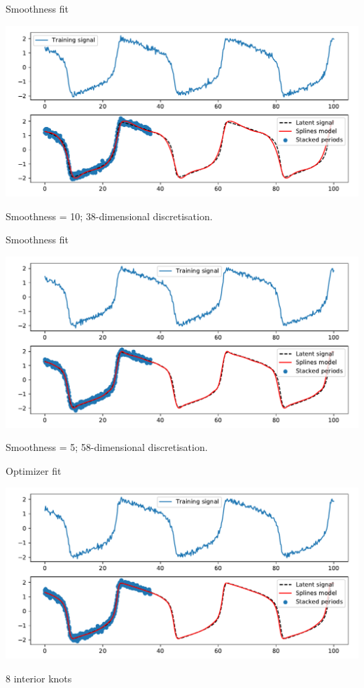 \documentclass[presentation]{beamer}
\begin{document}
\begin{frame}[label={sec:orgdc37deb}]{Smoothness fit}
   \begin{center}
\includegraphics[width=.9\linewidth]{./fit1.pdf}
\end{center}
Smoothness = 10; 38-dimensional discretisation.
\end{frame}

\begin{frame}[label={sec:org53ba107}]{Smoothness fit}
   \begin{center}
\includegraphics[width=.9\linewidth]{./fit2.pdf}
\end{center}
Smoothness = 5; 58-dimensional discretisation.
\end{frame}

\begin{frame}[label={sec:org22748d4}]{Optimizer fit}
   \begin{center}
\includegraphics[width=.9\linewidth]{./fit3.pdf}
\end{center}
8 interior knots
\end{frame}
\end{document}
